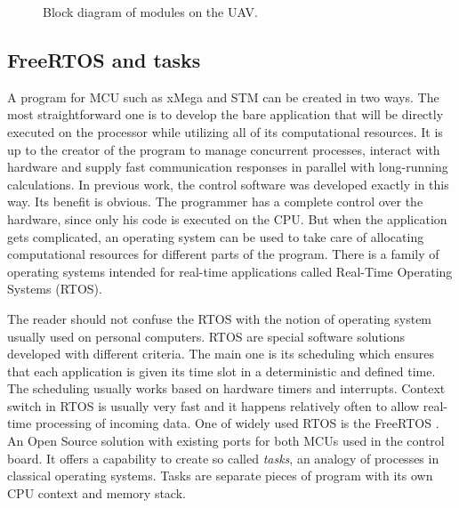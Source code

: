 \begin{figure}[h]
\caption{Block diagram of modules on the UAV.}
\label{fig:block_diagram_uav}
\end{figure}

\subsection{FreeRTOS and tasks}

A program for MCU such as xMega and STM can be created in two ways. The most straightforward one is to develop the bare application that will be directly executed on the processor while utilizing all of its computational resources. It is up to the creator of the program to manage concurrent processes, interact with hardware and supply fast communication responses in parallel with long-running calculations. In previous work, the control software was developed exactly in this way. Its benefit is obvious. The programmer has a complete control over the hardware, since only his code is executed on the CPU. But when the application gets complicated, an operating system can be used to take care of allocating computational resources for different parts of the program. There is a family of operating systems intended for real-time applications called Real-Time Operating Systems (RTOS). 

The reader should not confuse the RTOS with the notion of operating system usually used on personal computers. RTOS are special software solutions developed with different criteria. The main one is its scheduling which ensures that each application is given its time slot in a deterministic and defined time. The scheduling usually works based on hardware timers and interrupts. Context switch in RTOS is usually very fast and it happens relatively often to allow real-time processing of incoming data. One of widely used RTOS is the FreeRTOS \citep{freertos}. An Open Source solution with existing ports for both MCUs used in the control board. It offers a capability to create so called \textit{tasks}, an analogy of processes in classical operating systems. Tasks are separate pieces of program with its own CPU context and memory stack. 

